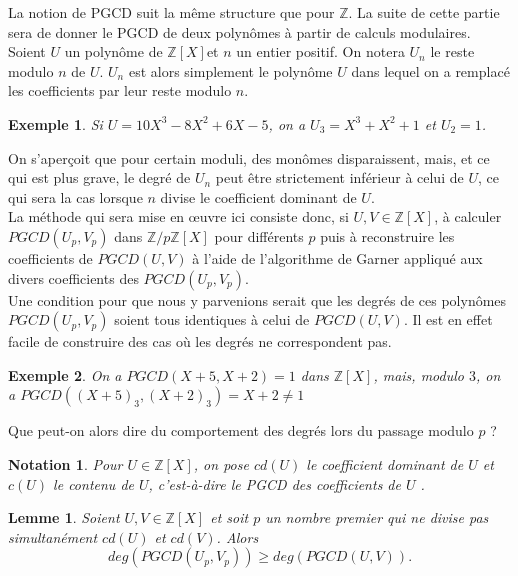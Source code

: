 \documentclass[10pt,a4paper]{report}
\newtheorem*{ex}{Exemple}
\newtheorem{Lem}[thm]{Lemme}
\newtheorem*{nota}{Notation}
\begin{document}
La notion de PGCD suit la même structure que pour $\mathbb{Z}$. La suite de cette partie sera de donner le PGCD de deux polynômes à partir de calculs modulaires.\\

Soient $U$ un polynôme de $\mathbb{Z}[X]$et $n$ un entier positif. On notera $U_n$ le reste modulo $n$ de $U$. $U_n$ est alors simplement le polynôme $U$ dans lequel on a remplacé les coefficients par leur reste modulo $n$.

\begin{ex}
Si $U=10X^3-8X^2+6X-5$, on a $U_3= X^3+ X^2 +1$ et $U_2=1$.
\end{ex}

On s'aperçoit que pour certain moduli, des monômes disparaissent, mais, et ce qui est plus grave, le degré de $U_n$ peut être strictement inférieur à celui de $U$, ce qui sera la cas lorsque $n$ divise le coefficient dominant de $U$.\\

La méthode qui sera mise en œuvre ici consiste donc, si $U,V\in \mathbb{Z}[X] $, à calculer $PGCD(U_p,V_p)$ dans $\mathbb{Z}/p\mathbb{Z}[X]$ pour différents $p$ puis à reconstruire les coefficients de $PGCD(U,V)$ à l'aide de l'algorithme de Garner appliqué aux divers coefficients des $PGCD(U_p,V_p)$. \\

Une condition pour que nous y parvenions serait que les degrés de ces polynômes $PGCD(U_p,V_p)$ soient tous identiques à celui de $PGCD(U,V)$. Il est en effet facile de construire des cas où les degrés ne correspondent pas.

\begin{ex}
On a $PGCD(X+5,X+2)=1$ dans $\mathbb{Z}[X]$, mais, modulo $3$, on a $PGCD((X+5)_3,(X+2)_3)=X+2\neq 1$
\end{ex}


Que peut-on alors dire du comportement des degrés lors du passage modulo $p$ ?


\begin{nota}
Pour $U \in \mathbb{Z}[X]$, on pose $cd(U)$ le coefficient dominant de $U$ et $c(U)$ le contenu de $U$, c'est-à-dire le PGCD des coefficients de $U$ .
\end{nota}

\begin{Lem}
Soient $U,V \in \mathbb{Z}[X]$ et soit $p$ un nombre premier qui ne divise pas simultanément $cd(U)$ et $cd(V)$. Alors
$$ deg (PGCD(U_p,V_p))\geqslant deg( PGCD(U,V) ).      $$ 
\end{Lem}
\end{document}
